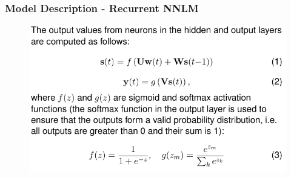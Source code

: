 \documentclass{beamer}
\begin{document}
\begin{frame}\frametitle{Model Description - Recurrent NNLM}
\begin{figure}
\includegraphics[width=0.8\linewidth]{figure/rnnlm_description.pdf}
\end{figure}
\end{frame}
\end{document}
